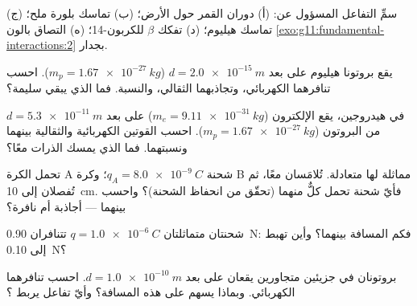 \begin{exercise}[$\star$]\label{exo:g11:fundamental-interactions:5}
سمِّ التفاعل المسؤول عن: (أ) دوران القمر حول الأرض؛
(ب) تماسك بلورة ملح؛ (ج) تماسك 
هيليوم؛ (د) تفكك $\beta$ للكربون-14؛ (ه) التصاق بالون
\cref{exo:g11:fundamental-interactions:2} بجدار.
\end{exercise}

\begin{exercise}[$\star\star$]\label{exo:g11:fundamental-interactions:6}
يقع بروتونا  هيليوم على بعد $d = \qty{2.0e-15}{m}$
($m_p = \qty{1.67e-27}{kg}$). احسب تنافرهما الكهربائي، وتجاذبهما
الثقالي، والنسبة. فما الذي يبقي  سليمة؟
\end{exercise}

\begin{exercise}[$\star\star$]\label{exo:g11:fundamental-interactions:7}
في  هيدروجين، يقع الإلكترون ($m_e = \qty{9.11e-31}{kg}$) على بعد
$d = \qty{5.3e-11}{m}$ من البروتون ($m_p = \qty{1.67e-27}{kg}$).
احسب القوتين الكهربائية والثقالية بينهما ونسبتهما.
فما الذي يمسك الذرات معًا؟
\end{exercise}

\begin{exercise}[$\star\star$]\label{exo:g11:fundamental-interactions:8}
تحمل الكرة A شحنة $q_A = \qty{+8.0e-9}{C}$؛ وكرة B مماثلة لها
متعادلة. تُلامَسان معًا، ثم تُفصلان إلى \qty{10}{cm}.
فأيّ شحنة تحمل كلٌّ منهما (تحقّق من انحفاظ الشحنة)؟ واحسب
 بينهما --- أجاذبة أم نافرة؟
\end{exercise}

\begin{exercise}[$\star\star$]\label{exo:g11:fundamental-interactions:9}
شحنتان متماثلتان $q = \qty{1.0e-6}{C}$ تتنافران  \qty{0.90}{N}:
فكم المسافة بينهما؟ وأين تهبط  إلى \qty{0.10}{N}؟
\end{exercise}

\begin{exercise}[$\star\star$]\label{exo:g11:fundamental-interactions:10}
بروتونان في جزيئين متجاورين يقعان على بعد $d = \qty{1.0e-10}{m}$.
احسب تنافرهما الكهربائي. وبماذا يسهم 
على هذه المسافة؟ وأيّ تفاعل يربط ؟
\end{exercise}

